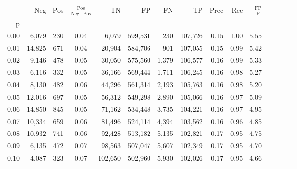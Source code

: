 \begin{tabular}{rrrcrrrrrrrrrrr}
\toprule
{} &     Neg &    Pos & $\frac{\text{Pos}}{\text{Neg}+\text{Pos}}$ &       TN &       FP &       FN &       TP &  Prec &   Rec & $\frac{\text{FP}}{\text{P}}$ \\
p    &         &        &                                            &          &          &          &          &       &       &                              \\
\midrule
0.00 &   6,079 &    230 &                                       0.04 &    6,079 &  599,531 &      230 &  107,726 &  0.15 &  1.00 &                         5.55 \\
0.01 &  14,825 &    671 &                                       0.04 &   20,904 &  584,706 &      901 &  107,055 &  0.15 &  0.99 &                         5.42 \\
0.02 &   9,146 &    478 &                                       0.05 &   30,050 &  575,560 &    1,379 &  106,577 &  0.16 &  0.99 &                         5.33 \\
0.03 &   6,116 &    332 &                                       0.05 &   36,166 &  569,444 &    1,711 &  106,245 &  0.16 &  0.98 &                         5.27 \\
0.04 &   8,130 &    482 &                                       0.06 &   44,296 &  561,314 &    2,193 &  105,763 &  0.16 &  0.98 &                         5.20 \\
0.05 &  12,016 &    697 &                                       0.05 &   56,312 &  549,298 &    2,890 &  105,066 &  0.16 &  0.97 &                         5.09 \\
0.06 &  14,850 &    845 &                                       0.05 &   71,162 &  534,448 &    3,735 &  104,221 &  0.16 &  0.97 &                         4.95 \\
0.07 &  10,334 &    659 &                                       0.06 &   81,496 &  524,114 &    4,394 &  103,562 &  0.16 &  0.96 &                         4.85 \\
0.08 &  10,932 &    741 &                                       0.06 &   92,428 &  513,182 &    5,135 &  102,821 &  0.17 &  0.95 &                         4.75 \\
0.09 &   6,135 &    472 &                                       0.07 &   98,563 &  507,047 &    5,607 &  102,349 &  0.17 &  0.95 &                         4.70 \\
0.10 &   4,087 &    323 &                                       0.07 &  102,650 &  502,960 &    5,930 &  102,026 &  0.17 &  0.95 &                         4.66 \\

\end{tabular}
